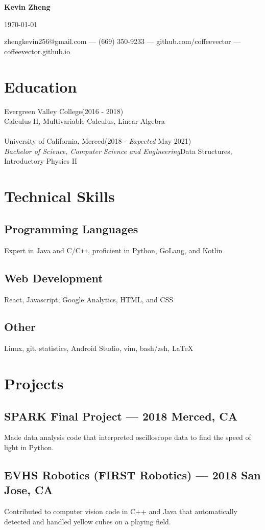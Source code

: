 \documentclass[letterpaper,12pt]{article}
\makeatletter
\newcommand\textbox[1]{%
	\parbox{.333\textwidth}{#1}%
}
\renewcommand{\maketitle}{
	\begin{center}
		\noindent\textbox{\hfill}\textbox{\hfil\bfseries\huge Kevin Zheng\hfil}\textbox{\hfill \today}
		{zhengkevin256@gmail.com --- (669) 350-9233 --- github.com/coffeevector --- coffeevector.github.io}
	\end{center} }
\makeatother
\begin{document}
\maketitle
\section{Education}
Evergreen Valley College\null\hfill (2016 - 2018)\\
\null\hfill Calculus II, Multivariable Calculus, Linear Algebra\\~\\
University of California, Merced\null\hfill(2018 - \emph{Expected} May 2021)\\
\emph{Bachelor of Science, Computer Science and Engineering}\null\hfill Data Structures, Introductory Physics II
\section{Technical Skills}
	\subsection{Programming Languages}
	Expert in Java and C/C\verb!++!, proficient in Python, GoLang, and Kotlin
	\vspace*{-2mm}
	\subsection{Web Development}
	React, Javascript, Google Analytics, HTML, and CSS
	\vspace*{-2mm}
	\subsection{Other}
	Linux, git, statistics, Android Studio, vim, bash/zsh, {\LaTeX}
\section{Projects}
	\subsection{SPARK Final Project --- 2018 \null\hfill Merced, CA}
	\par Made data analysis code that interpreted oscilloscope data to find the speed of light in Python.
	\vspace*{-2mm}
	\subsection{EVHS Robotics (FIRST Robotics) --- 2018 \null\hfill San Jose, CA}
	\par Contributed to computer vision code in C++ and Java that automatically detected and handled yellow cubes on a playing field.
	\vspace*{-2mm}
\end{document}
